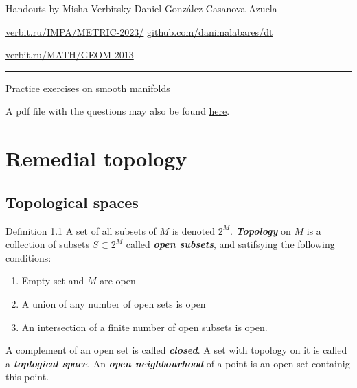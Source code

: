 \usepackage{multicol}
%



\begin{minipage}{\textwidth}
	\begin{minipage}{1\textwidth}
	Handouts by Misha Verbitsky	 \hfill Daniel González Casanova Azuela
		
		{\small \href{http://verbit.ru/IMPA/METRIC-2023/}{verbit.ru/IMPA/METRIC-2023/} \hfill\href{https://github.com/danimalabares/dt}{github.com/danimalabares/dt}

		 \href{http://verbit.ru/MATH/GEOM-2013/}{verbit.ru/MATH/GEOM-2013}}
	\end{minipage}
\end{minipage}\vspace{.2cm}\hrule

\vspace{10pt}
{\huge Practice exercises on smooth manifolds}

A pdf file with the questions may also be found \href{https://github.com/danimalabares/dt/blob/main/handouts/questions.pdf}{here}.

\section{Remedial topology}

\subsection{Topological spaces}

\begin{thing3}{Definition 1.1}\leavevmode
	A set of all subsets of $M$ is denoted $2^M$. \textit{\textbf{Topology}} on $M$ is a collection of subsets $S \subset 2^M$ called \textit{\textbf{open subsets}}, and satifsying the following conditions:
	\begin{enumerate}
	\item Empty set and $M$ are open
	\item A union of any number of open sets is open
	\item An intersection of a finite number of open subsets is open.
	\end{enumerate}
	A complement of an open set is called \textit{\textbf{closed}}. A set with topology on it is called a \textit{\textbf{toplogical space}}. An \textit{\textbf{open neighbourhood}} of a point is an open set containig this point.
\end{thing3}

